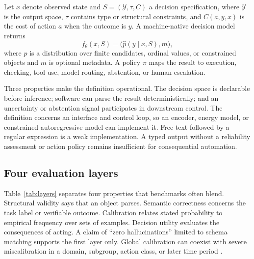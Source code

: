 \documentclass[11pt]{article}
\begin{document}
Let $x$ denote observed state and $S=(\mathcal{Y},\tau,C)$ a decision specification, where $\mathcal{Y}$ is the output space, $\tau$ contains type or structural constraints, and $C(a,y,x)$ is the cost of action $a$ when the outcome is $y$. A machine-native decision model returns
\begin{equation}
 f_\theta(x,S)=\bigl(\hat p(y\mid x,S),m\bigr),
\end{equation}
where $\hat p$ is a distribution over finite candidates, ordinal values, or constrained objects and $m$ is optional metadata. A policy $\pi$ maps the result to execution, checking, tool use, model routing, abstention, or human escalation.

Three properties make the definition operational. The decision space is declarable before inference; software can parse the result deterministically; and an uncertainty or abstention signal participates in downstream control. The definition concerns an interface and control loop, so an encoder, energy model, or constrained autoregressive model can implement it. Free text followed by a regular expression is a weak implementation. A typed output without a reliability assessment or action policy remains insufficient for consequential automation.

\subsection{Four evaluation layers}

Table~\ref{tab:layers} separates four properties that benchmarks often blend. Structural validity says that an object parses. Semantic correctness concerns the task label or verifiable outcome. Calibration relates stated probability to empirical frequency over sets of examples. Decision utility evaluates the consequences of acting. A claim of ``zero hallucinations'' limited to schema matching supports the first layer only. Global calibration can coexist with severe miscalibration in a domain, subgroup, action class, or later time period \cite{silvafilho2023calibration}.
\end{document}
